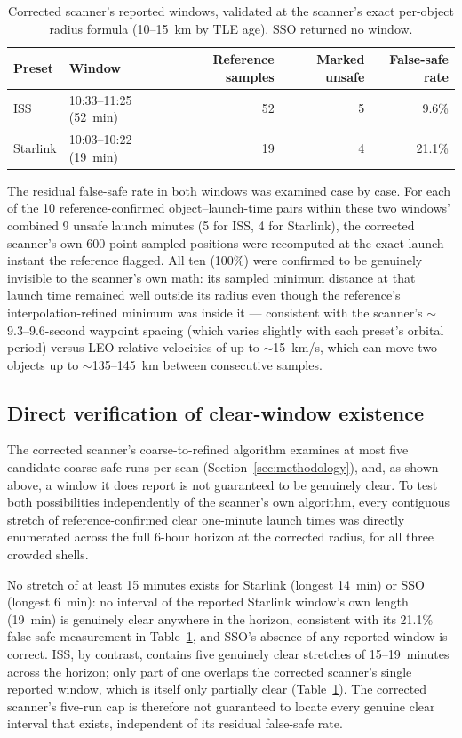 \documentclass[11pt,a4paper]{article}
\begin{document}
\begin{table}[h]
\centering
\begin{tabular}{llrrr}
\toprule
Preset & Window & Reference samples & Marked unsafe & False-safe rate \\
\midrule
ISS       & 10:33--11:25 (52~min) & 52 & 5 & 9.6\% \\
Starlink  & 10:03--10:22 (19~min) & 19 & 4 & 21.1\% \\
\bottomrule
\end{tabular}
\caption{Corrected scanner's reported windows, validated at the scanner's
exact per-object radius formula (10--15~km by TLE age). SSO returned no
window.}
\label{tab:fixed}
\end{table}

The residual false-safe rate in both windows was examined case by case. For
each of the 10 reference-confirmed object--launch-time pairs within these
two windows' combined 9 unsafe launch minutes (5 for ISS, 4 for Starlink),
the corrected scanner's own 600-point sampled positions were recomputed at
the exact launch instant the reference flagged. All ten (100\%) were
confirmed to be genuinely invisible to the scanner's own math: its sampled
minimum distance at that launch time remained well outside its radius even
though the reference's interpolation-refined minimum was inside it ---
consistent with the scanner's $\sim$9.3--9.6-second waypoint spacing (which
varies slightly with each preset's orbital period) versus LEO relative
velocities of up to $\sim$15~km/s, which can move two objects up to
$\sim$135--145~km between consecutive samples.

\subsection{Direct verification of clear-window existence}

The corrected scanner's coarse-to-refined algorithm examines at most five
candidate coarse-safe runs per scan (Section~\ref{sec:methodology}), and, as
shown above, a window it does report is not guaranteed to be genuinely
clear. To test both possibilities independently of the scanner's own
algorithm, every contiguous stretch of reference-confirmed clear one-minute
launch times was directly enumerated across the full 6-hour horizon at the
corrected radius, for all three crowded shells.

No stretch of at least 15 minutes exists for Starlink (longest 14~min) or
SSO (longest 6~min): no interval of the reported Starlink window's own
length (19~min) is genuinely clear anywhere in the horizon, consistent with
its 21.1\% false-safe measurement in Table~\ref{tab:fixed}, and SSO's
absence of any reported window is correct. ISS, by contrast, contains five
genuinely clear stretches of 15--19~minutes across the horizon; only part of
one overlaps the corrected scanner's single reported window, which is
itself only partially clear (Table~\ref{tab:fixed}). The corrected
scanner's five-run cap is therefore not guaranteed to locate every genuine
clear interval that exists, independent of its residual false-safe rate.
\end{document}

